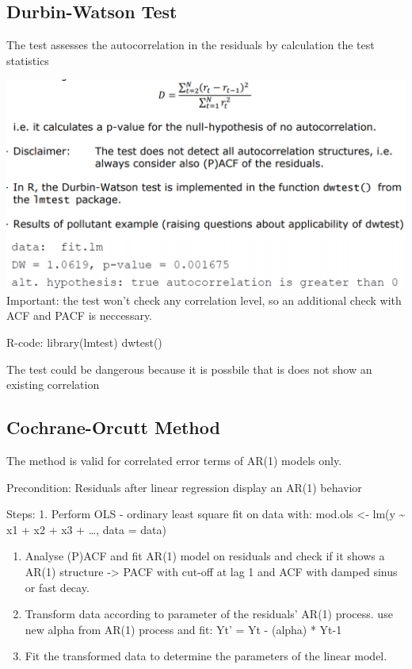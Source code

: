\documentclass[
]{article}
\begin{document}
\hypertarget{durbin-watson-test}{%
\subsection{Durbin-Watson Test}\label{durbin-watson-test}}

The test assesses the autocorrelation in the residuals by calculation
the test statistics

\includegraphics[width=0.5\linewidth]{dwt} Important: the test won't
check any correlation level, so an additional check with ACF and PACF is
neccessary.

R-code: library(lmtest) dwtest()

The test could be dangerous because it is possbile that is does not show
an existing correlation

\hypertarget{cochrane-orcutt-method}{%
\subsection{Cochrane-Orcutt Method}\label{cochrane-orcutt-method}}

The method is valid for correlated error terms of AR(1) models only.

Precondition: Residuals after linear regression display an AR(1)
behavior

Steps: 1. Perform OLS - ordinary least square fit on data with: mod.ols
\textless- lm(y \textasciitilde{} x1 + x2 + x3 + \ldots, data = data)

\begin{enumerate}
\def\labelenumi{\arabic{enumi}.}
\setcounter{enumi}{1}
\item
  Analyse (P)ACF and fit AR(1) model on residuals and check if it shows
  a AR(1) structure -\textgreater{} PACF with cut-off at lag 1 and ACF
  with damped sinus or fast decay.
\item
  Transform data according to parameter of the residuals' AR(1) process.
  use new alpha from AR(1) process and fit: Yt' = Yt - (alpha) * Yt-1
\item
  Fit the transformed data to determine the parameters of the linear
  model.
\end{enumerate}
\end{document}
